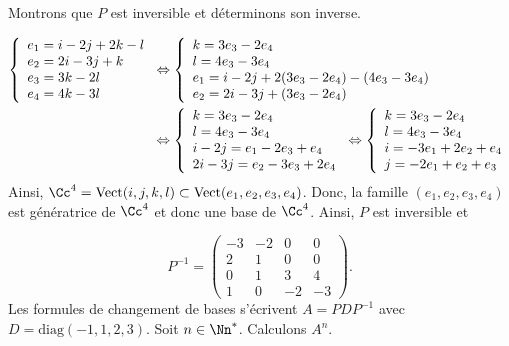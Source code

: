 {\begin{enumerate}
{Montrons que $P$ est inversible et déterminons son inverse.

\begin{align*}\ensuremath
\left\{
\begin{array}{l}
e_1=i-2j+2k-l\\
e_2=2i-3j+k\\
e_3=3k-2l\\
e_4=4k-3l
\end{array}
\right.
&\Leftrightarrow
\left\{
\begin{array}{l}
k=3e_3-2e_4\\
l=4e_3-3e_4\\
e_1=i-2j+2(3e_3-2e_4)-(4e_3-3e_4)\\
e_2=2i-3j+(3e_3-2e_4)
\end{array}
\right.
\\
 &\Leftrightarrow
\left\{
\begin{array}{l}
k=3e_3-2e_4\\
l=4e_3-3e_4\\
i-2j=e_1-2e_3+e_4\\
2i-3j=e_2-3e_3+2e_4
\end{array}
\right.\Leftrightarrow
\left\{
\begin{array}{l}
k=3e_3-2e_4\\
l=4e_3-3e_4\\
i=-3e_1+2e_2+e_4\\
j=-2e_1+e_2+e_3
\end{array}
\right.
\end{align*}
Ainsi, $\Cc^4=\mbox{Vect}(i,j,k,l)\subset\mbox{Vect}(e_1,e_2,e_3,e_4)$. Donc, la famille $(e_1,e_2,e_3,e_4)$ est génératrice de $\Cc^4$ et donc une base de $\Cc^4$. Ainsi, $P$ est inversible et 

$$P^{-1}=
\left(
\begin{array}{cccc}
-3&-2&0&0\\
2&1&0&0\\
0&1&3&4\\
1&0&-2&-3
\end{array}
\right)
.$$
Les formules de changement de bases s'écrivent $A=PDP^{-1}$ avec $D=\mbox{diag}(-1,1,2,3)$.
Soit $n\in\Nn^*$. Calculons $A^n$.

}
\end{enumerate}}
